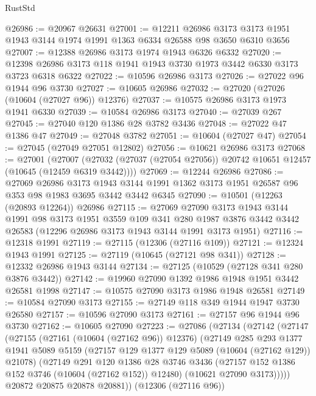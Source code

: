 \begin{lexlean}{RustStd}
\begin{coremodule}
@26986 := @20967 @26631
@27001 := @12211
    @26986
    @3173
    @3173
    @1951
    @1943
    @3144
    @1974
    @1991
    @1363
    @6334
    @26588
    @98
    @3650
    @6310
    @3656
@27007 := @12388 @26986 @3173 @1974 @1943 @6326 @6332
@27020 := @12398 @26986 @3173 @118 @1941 @1943 @3730 @1973 @3442 @6330 @3173 @3723 @6318 @6322
@27022 := @10596 @26986 @3173
@27026 := @27022 @96 @1944 @96 @3730
@27027 := @10605 @26986
@27032 := @27020 (@27026 (@10604 (@27027 @96)) @12376)
@27037 := @10575 @26986 @3173 @1973 @1941 @6330
@27039 := @10584 @26986 @3173
@27040 := @27039 @267
@27045 := @27040 @120 @1386 @28 @3782 @3436
@27048 := @27022 @47 @1386 @47
@27049 := @27048 @3782
@27051 := @10604 (@27027 @47)
@27054 := @27045 (@27049 @27051 @12802)
@27056 := @10621 @26986 @3173
@27068 := @27001
    (@27007 (@27032 (@27037 (@27054 @27056)) @20742 @10651 @12457 (@10645 (@12459 @6319 @3442))))
@27069 := @12244 @26986
@27086 := @27069
    @26986
    @3173
    @1943
    @3144
    @1991
    @1362
    @3173
    @1951
    @26587
    @96
    @353
    @98
    @1983
    @3695
    @3442
    @3442
    @6345
@27090 := @10501 (@12263 (@20893 @12264)) @26986
@27115 := @27069
    @27090
    @3173
    @1943
    @3144
    @1991
    @98
    @3173
    @1951
    @3559
    @109
    @341
    @280
    @1987
    @3876
    @3442
    @3442
    @26583
    (@12296 @26986 @3173 @1943 @3144 @1991 @3173 @1951)
@27116 := @12318 @1991
@27119 := @27115 (@12306 (@27116 @109))
@27121 := @12324 @1943 @1991
@27125 := @27119 (@10645 (@27121 @98 @341))
@27128 := @12332 @26986 @1943 @3144
@27134 := @27125 (@10529 (@27128 @341 @280 @3876 @3442))
@27142 := @19960 @27090 @1392 @1986 @1948 @1951 @3442 @26581 @1998
@27147 := @10575 @27090 @3173 @1986 @1948 @26581
@27149 := @10584 @27090 @3173
@27155 := @27149 @118 @349 @1944 @1947 @3730 @26580
@27157 := @10596 @27090 @3173
@27161 := @27157 @96 @1944 @96 @3730
@27162 := @10605 @27090
@27223 := @27086
    (@27134
      (@27142
        (@27147
          (@27155
            (@27161 (@10604 (@27162 @96)) @12376)
            (@27149
              @285
              @293
              @1377
              @1941
              @5089
              @5159
              (@27157 @129 @1377 @129 @5089 (@10604 (@27162 @129)) @21078)
              (@27149
                @291
                @120
                @1386
                @28
                @3746
                @3436
                (@27157 @152 @1386 @152 @3746 (@10604 (@27162 @152)) @12480)
                (@10621 @27090 @3173)))))
        @20872
        @20875
        @20878
        @20881))
    (@12306 (@27116 @96))

\end{coremodule}
\end{lexlean}
